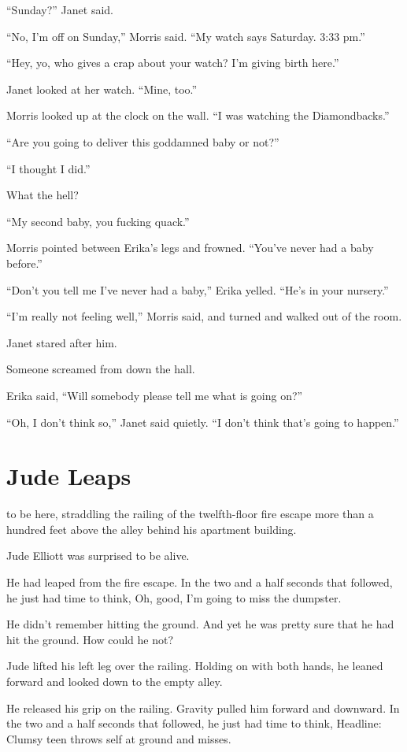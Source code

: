 “Sunday?” Janet said.

“No, I’m off on Sunday,” Morris said. “My watch says Saturday. 3:33 pm.”

“Hey, yo, who gives a crap about your watch? I’m giving birth here.”

Janet looked at her watch. “Mine, too.”

Morris looked up at the clock on the wall. “I was watching the Diamondbacks.”

“Are you going to deliver this goddamned baby or not?”

“I thought I did.”

What the hell?

“My second baby, you fucking quack.”

Morris pointed between Erika’s legs and frowned. “You’ve never had a baby before.”

“Don’t you tell me I’ve never had a baby,” Erika yelled. “He’s in your nursery.”

“I’m really not feeling well,” Morris said, and turned and walked out of the room.

Janet stared after him.

Someone screamed from down the hall.

Erika said, “Will somebody please tell me what is going on?”

“Oh, I don’t think so,” Janet said quietly. “I don’t think that’s going to happen.”



\section{Jude Leaps}

 to be here, straddling the railing of the twelfth-floor fire escape more than a hundred feet above the alley behind his apartment building.

Jude Elliott was surprised to be alive.

He had leaped from the fire escape. In the two and a half seconds that followed, he just had time to think, Oh, good, I’m going to miss the dumpster.

He didn’t remember hitting the ground. And yet he was pretty sure that he had hit the ground. How could he not?

Jude lifted his left leg over the railing. Holding on with both hands, he leaned forward and looked down to the empty alley.

He released his grip on the railing. Gravity pulled him forward and downward. In the two and a half seconds that followed, he just had time to think, Headline: Clumsy teen throws self at ground and misses.

